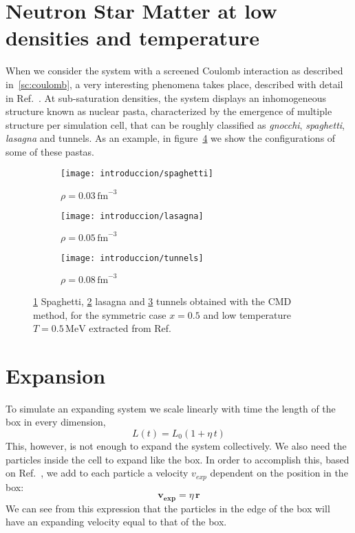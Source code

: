 \section{Neutron Star Matter at low densities and
  temperature}\label{sc:nsm_lowd}

When we consider the system with a screened Coulomb interaction as
described in~\ref{sc:coulomb}, a very interesting phenomena takes
place, described with detail in Ref.~\cite{alcain_effect_2014}. At
sub-saturation densities, the system displays an inhomogeneous
structure known as nuclear pasta, characterized by the emergence of
multiple structure per simulation cell, that can be roughly classified
as \emph{gnocchi}, \emph{spaghetti}, \emph{lasagna} and tunnels. As an
example, in figure~\ref{fig:pasta} we show the configurations of some
of these pastas.


\begin{figure}[h]
  \begin{subfigure}[h!]{0.45\columnwidth}
    \texttt{[image: introduccion/spaghetti]}
    \caption{$\rho = 0.03\,\text{fm}^{-3}$}
    \label{sfig:spaghetti}
  \end{subfigure}
  \begin{subfigure}[h!]{0.45\columnwidth}
    \texttt{[image: introduccion/lasagna]}
    \caption{$\rho = 0.05\,\text{fm}^{-3}$}
    \label{sfig:lasagna}
  \end{subfigure}
  \begin{subfigure}[h!]{0.45\columnwidth}
    \texttt{[image: introduccion/tunnels]}
    \caption{$\rho = 0.08\,\text{fm}^{-3}$}
    \label{sfig:tunnels}
  \end{subfigure}
  \centering
  \caption{\ref{sfig:spaghetti} Spaghetti, \ref{sfig:lasagna} lasagna
    and \ref{sfig:tunnels} tunnels obtained with the CMD method, for
    the symmetric case $x=0.5$ and low temperature $T=0.5\,\text{MeV}$
    extracted from Ref.~\cite{alcain_effect_2014}}
  \label{fig:pasta}
\end{figure}


\section{Expansion}\label{sc:expansion}

To simulate an expanding system we scale linearly with time the length
of the box in every dimension,
\begin{equation*}
  L(t) = L_0 (1 + \eta\,t)
\end{equation*}
This, however, is not enough to expand the system collectively. We
also need the particles inside the cell to expand like the box. In
order to accomplish this, based on Ref.~\cite{dorso_onset_1996}, we
add to each particle a velocity $v_{exp}$ dependent on the position in
the box:
\begin{equation*}
  \mathbf{v_{exp}} = \eta\,\mathbf{r}
\end{equation*}
We can see from this expression that the particles in the edge of the
box will have an expanding velocity equal to that of the box.

